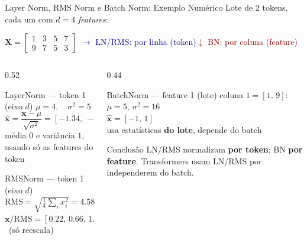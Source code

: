\documentclass[aspectratio=169, xcolor=dvipsnames]{beamer}
\begin{document}
  \begin{frame}{Layer Norm, RMS Norm e Batch Norm: Exemplo Numérico}
    Lote de 2 tokens, cada um com $d=4$ \textit{features}:
    \begin{center}
      $\mathbf{X}=\begin{bmatrix}1&3&5&7\\9&7&5&3\end{bmatrix}$\qquad
      {\small\textcolor{DarkBlue}{$\rightarrow$ LN/RMS: por linha (token)}\quad\textcolor{DarkRed}{$\downarrow$ BN: por coluna (feature)}}
    \end{center}
    \begin{columns}[T]
      \begin{column}{0.52\textwidth}
        \begin{block}{LayerNorm --- token 1 (eixo $d$)}
          $\mu=4,\quad\sigma^2=5$\\[2pt]
          $\hat{\mathbf{x}}=\dfrac{\mathbf{x}-\mu}{\sqrt{\sigma^2}}=[-1.34,\,-0.45,\,0.45,\,1.34]$\\[2pt]
          {\footnotesize média $0$ e variância $1$, usando só as features do token}
        \end{block}
        \begin{block}{RMSNorm --- token 1 (eixo $d$)}
          $\text{RMS}=\sqrt{\tfrac{1}{4}\textstyle\sum_i x_i^2}=4.58$\\[2pt]
          $\mathbf{x}/\text{RMS}=[0.22,\,0.66,\,1.09,\,1.53]$\ {\footnotesize(só reescala)}
        \end{block}
      \end{column}
      \begin{column}{0.44\textwidth}
        \begin{alertblock}{BatchNorm --- feature 1 (lote)}
          coluna $1=[1,\,9]$:\ $\mu=5,\ \sigma^2=16$\\[2pt]
          $\hat{\mathbf{x}}=[-1,\,1]$\\[2pt]
          {\footnotesize usa estatísticas \textbf{do lote}, depende do batch}
        \end{alertblock}
        \begin{exampleblock}{Conclusão}
          LN/RMS normalizam \textbf{por token}; BN \textbf{por feature}. Transformers usam LN/RMS por independerem do batch.
        \end{exampleblock}
      \end{column}
    \end{columns}
  \end{frame}
\end{document}
